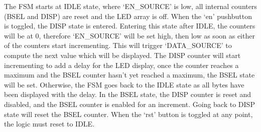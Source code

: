 \documentclass[11pt]{report}
\begin{document}
The FSM starts at IDLE state, where `EN\_SOURCE' is low, all internal counters (BSEL and DISP) are reset and
the LED array is off. When the `en' pushbutton is toggled, the DISP state is entered. Entering this state
after IDLE, the counters will be at 0, therefore `EN\_SOURCE' will be set high, then low as soon as either of
the counters start incrementing. This will trigger `DATA\_SOURCE' to compute the next value which will be
displayed. The DISP counter will start incrementing to add a delay for the LED display, once the counter
reaches a maximum and the BSEL counter hasn't yet reached a maximum, the BSEL state will be set. Otherwise,
the FSM goes back to the IDLE state as all bytes have been displayed with the delay. In the BSEL state, the
DISP counter is reset and disabled, and the BSEL counter is enabled for an increment. Going back to DISP state
will reset the BSEL counter. When the `rst' button is toggled at any point, the logic must reset to IDLE.
\end{document}
